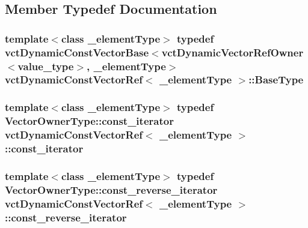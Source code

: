 \subsection{Member Typedef Documentation}
\hypertarget{classvct_dynamic_const_vector_ref_aba5f5c67feb404f0cf15c0f205625fec}{
\subsubsection[{Base\-Type}]{\setlength{\rightskip}{0pt plus 5cm}template$<$class \-\_\-element\-Type$>$ typedef {\bf vct\-Dynamic\-Const\-Vector\-Base}$<${\bf vct\-Dynamic\-Vector\-Ref\-Owner}$<$value\-\_\-type$>$, \-\_\-element\-Type$>$ {\bf vct\-Dynamic\-Const\-Vector\-Ref}$<$ \-\_\-element\-Type $>$\-::{\bf Base\-Type}}}\label{classvct_dynamic_const_vector_ref_aba5f5c67feb404f0cf15c0f205625fec}
\hypertarget{classvct_dynamic_const_vector_ref_a745d586c746244f3326ca5a07c73dea5}{
\subsubsection[{const\-\_\-iterator}]{\setlength{\rightskip}{0pt plus 5cm}template$<$class \-\_\-element\-Type$>$ typedef {\bf Vector\-Owner\-Type\-::const\-\_\-iterator} {\bf vct\-Dynamic\-Const\-Vector\-Ref}$<$ \-\_\-element\-Type $>$\-::{\bf const\-\_\-iterator}}}\label{classvct_dynamic_const_vector_ref_a745d586c746244f3326ca5a07c73dea5}
\hypertarget{classvct_dynamic_const_vector_ref_af3fefcebbdfdf747813c57272961cd9d}{
\subsubsection[{const\-\_\-reverse\-\_\-iterator}]{\setlength{\rightskip}{0pt plus 5cm}template$<$class \-\_\-element\-Type$>$ typedef {\bf Vector\-Owner\-Type\-::const\-\_\-reverse\-\_\-iterator} {\bf vct\-Dynamic\-Const\-Vector\-Ref}$<$ \-\_\-element\-Type $>$\-::{\bf const\-\_\-reverse\-\_\-iterator}}}\label{classvct_dynamic_const_vector_ref_af3fefcebbdfdf747813c57272961cd9d}
